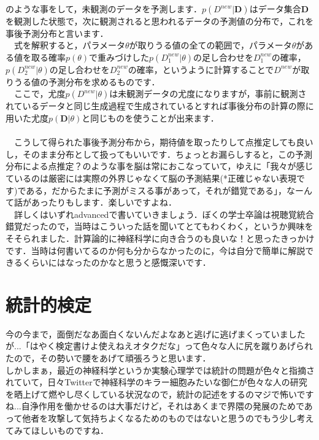 \documentclass[11pt,a4paper,uplatex]{ujreport} 	%
\begin{document}
のような事をして，未観測のデータを予測します．$p(D^{new}|\mathbf{D})$はデータ集合$\mathbf{D}$を観測した状態で，次に観測されると思われるデータの予測値の分布で，これを事後予測分布と言います．\\
　式を解釈すると，パラメータ$\theta$が取りうる値の全ての範囲で，パラメータ$\theta$がある値を取る確率$p(\theta)$で重みづけした$p(D^{new}_1|\theta)$の足し合わせを$D^{new}_1$の確率，$p(D^{new}_2|\theta)$の足し合わせを$D^{new}_2$の確率，というように計算することで$D^{new}$が取りうる値の予測分布を求めるものです．\\
　ここで，尤度$p(D^{new}|\theta)$は未観測データの尤度になりますが，事前に観測されているデータと同じ生成過程で生成されているとすれば事後分布の計算の際に用いた尤度$p(\mathbf{D}|\theta)$と同じものを使うことが出来ます．\\
\\
　こうして得られた事後予測分布から，期待値を取ったりして点推定しても良いし，そのまま分布として扱ってもいいです．ちょっとお漏らしすると，この予測分布による点推定？のような事を脳は常におこなっていて，ゆえに「我々が感じているのは厳密には実際の外界じゃなくて脳の予測結果(*正確じゃない表現です)である，だからたまに予測がミスる事があって，それが錯覚である」，なーんて話があったりもします．楽しいですよね．\\
　詳しくはいずれadvancedで書いていきましょう．ぼくの学士卒論は視聴覚統合錯覚だったので，当時はこういった話を聞いてとてもわくわく，というか興味をそそられました．計算論的に神経科学に向き合うのも良いな！と思ったきっかけです．当時は何書いてるのか何も分からなかったのに，今は自分で簡単に解説できるくらいにはなったのかなと思うと感慨深いです．\\




\chapter{統計的検定}
今の今まで，面倒だなあ面白くないんだよなあと逃げに逃げまくっていましたが...「はやく検定書けよ使えねえオタクだな」って色々な人に尻を蹴りあげられたので，その勢いで腰をあげて頑張ろうと思います．\\

しかしまぁ，最近の神経科学というか実験心理学では統計の問題が色々と指摘されていて，日々Twitterで神経科学のキラー細胞みたいな御仁が色々な人の研究を晒上げて燃やし尽くしている状況なので，統計の記述をするのマジで怖いですね...自浄作用を働かせるのは大事だけど，それはあくまで界隈の発展のためであって他者を攻撃して気持ちよくなるためのものではないと思うのでもう少し考えてみてほしいものですね．
\end{document}

